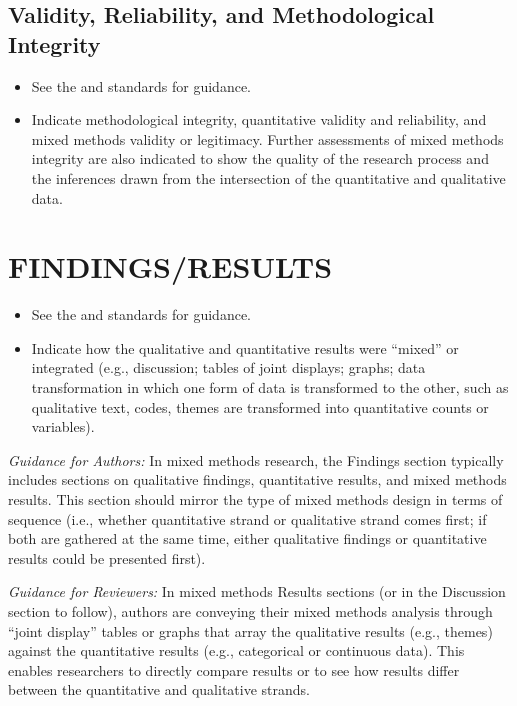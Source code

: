 \documentclass[acmsmall]{acmart}
\begin{document}
\subsection{Validity, Reliability, and Methodological Integrity}
\begin{itemize}
\item See the \hyperlink{https://apastyle.apa.org/jars/quantitative}{\color{blue}{JARS-QUANT}} and \hyperlink{https://apastyle.apa.org/jars/qualitative}{\color{blue}{JARS-QUAL}} standards for guidance.
\item Indicate methodological integrity, quantitative validity and reliability, and mixed methods validity or legitimacy. Further assessments of mixed methods integrity are also indicated to show the quality of the research process and the inferences drawn from the intersection of the quantitative and qualitative data.
\end{itemize}

\section{FINDINGS/RESULTS}
\begin{itemize}
\item See the \hyperlink{https://apastyle.apa.org/jars/quantitative}{\color{blue}{JARS-QUANT}} and \hyperlink{https://apastyle.apa.org/jars/qualitative}{\color{blue}{JARS-QUAL}} standards for guidance.
\item Indicate how the qualitative and quantitative results were “mixed” or integrated (e.g., discussion; tables of joint displays; graphs; data transformation in which one form of data is transformed to the other, such as qualitative text, codes, themes are transformed into quantitative counts or variables).
\end{itemize}

\textit{Guidance for Authors:}  In mixed methods research, the Findings section typically includes sections on qualitative findings, quantitative results, and mixed methods results. This section should mirror the type of mixed methods design in terms of sequence (i.e., whether quantitative strand or qualitative strand comes first; if both are gathered at the same time, either qualitative findings or quantitative results could be presented first).

\textit{Guidance for Reviewers:} In mixed methods Results sections (or in the Discussion section to follow), authors are conveying their mixed methods analysis through “joint display” tables or graphs that array the qualitative results (e.g., themes) against the quantitative results (e.g., categorical or continuous data). This enables researchers to directly compare results or to see how results differ between the quantitative and qualitative strands.
\end{document}
